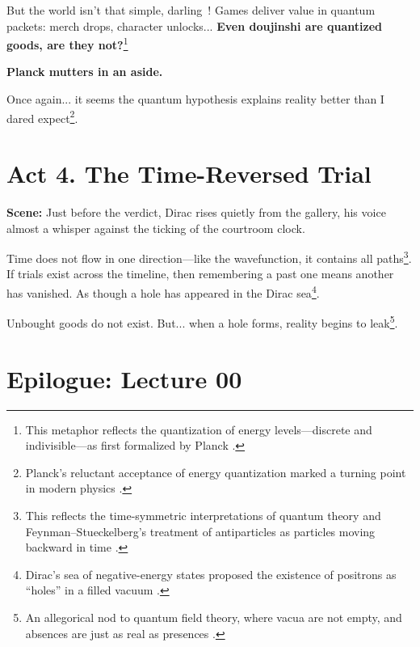 \documentclass[12pt]{article}
\begin{document}
\begin{tcolorbox}[title=Cagliostro:]
But the world isn’t that simple, darling~! Games deliver value in quantum packets: merch drops, character unlocks... \textbf{Even doujinshi are quantized goods, are they not?}\footnote{This metaphor reflects the quantization of energy levels—discrete and indivisible—as first formalized by Planck \cite{planck1901law}.}
\end{tcolorbox}

\textbf{Planck mutters in an aside.}

\begin{tcolorbox}[title=Planck (aside):]
Once again... it seems the quantum hypothesis explains reality better than I dared expect\footnote{Planck’s reluctant acceptance of energy quantization marked a turning point in modern physics \cite{sakurai2020modern}.}.
\end{tcolorbox}

\section*{Act 4. The Time-Reversed Trial}

\textbf{Scene:} Just before the verdict, Dirac rises quietly from the gallery, his voice almost a whisper against the ticking of the courtroom clock.

\begin{tcolorbox}[title=Dirac (aside):]
Time does not flow in one direction—like the wavefunction, it contains all paths\footnote{This reflects the time-symmetric interpretations of quantum theory and Feynman–Stueckelberg's treatment of antiparticles as particles moving backward in time \cite{dirac1981principles,carroll2004introduction}.}. If trials exist across the timeline, then remembering a past one means another has vanished. As though a hole has appeared in the Dirac sea\footnote{Dirac’s sea of negative-energy states proposed the existence of positrons as ``holes'' in a filled vacuum \cite{dirac1981principles}.}.
\end{tcolorbox}
    
\begin{tcolorbox}[title=Dirac:]
Unbought goods do not exist. But... when a hole forms, reality begins to leak\footnote{An allegorical nod to quantum field theory, where vacua are not empty, and absences are just as real as presences \cite{zurek2002decoherence}.}.
\end{tcolorbox}

\section*{Epilogue: Lecture 00}
\end{document}
